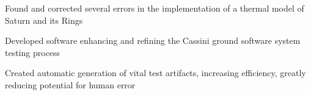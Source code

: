 \documentclass[letterpaper]{deedy-resume} %
\begin{document}
\begin{minipage}[t]{0.66\textwidth}

\begin{tightitemize}
\item Found and corrected several errors in the implementation of a thermal model of Saturn and its Rings
\item Developed software enhancing and refining the Cassini ground software system testing process
\item Created automatic generation of vital test artifacts, increasing efficiency, greatly reducing potential for human error
\end{tightitemize}







\end{minipage}
\end{document}
